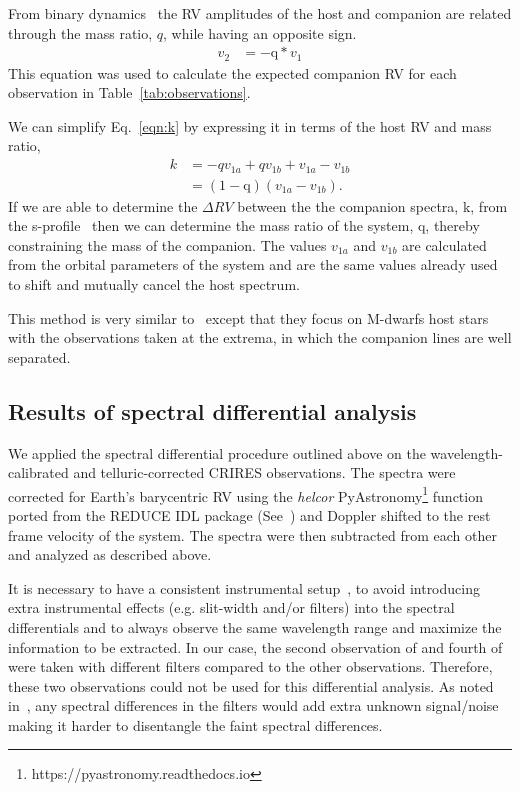 From binary dynamics~\citep[e.g.][]{murray_keplerian_2010} the RV amplitudes of the host and companion are related through the mass ratio, \(q \), while having an opposite sign.
\begin{align}
	v_{2}  &= -\textrm{q} * v_{1} \label{eqn:q_relation}
\end{align}
This equation was used to calculate the expected companion RV for each observation in Table~\ref{tab:observations}. 

We can simplify Eq.~\ref{eqn:k} by expressing it in terms of the host RV and mass ratio,
\begin{align}
	k &= -q v_{1a} + q v_{1b} + v_{1a} - v_{1b} \nonumber \\
	&= (1 - \textrm{q})(v_{1a} - v_{1b}). \label{eqn:k_simplified}
\end{align}
If we are able to determine the \(\Delta RV \) between the the companion spectra, k, from the s-profile~\citep[see ][]{ferluga_separating_1997} then we can determine the mass ratio of the system, q, thereby constraining the mass of the companion. The values \(v_{1a} \) and \(v_{1b} \) are calculated from the orbital parameters of the system and are the same values already used to shift and mutually cancel the host spectrum.

This method is very similar to~\citet{kostogryz_spectral_2013} except that they focus on M-dwarfs host stars with the observations taken at the extrema, in which the companion lines are well separated.


\subsection{Results of spectral differential analysis}

\label{appendix:A2}
We applied the spectral differential procedure outlined above on the wavelength-calibrated and telluric-corrected CRIRES observations. The spectra were corrected for Earth's barycentric RV using the \emph{helcor} PyAstronomy\footnote{https://pyastronomy.readthedocs.io} function ported from the REDUCE IDL package (See~\citet[][]{piskunov_new_2002}) and Doppler shifted to the rest frame velocity of the system. The spectra were then subtracted from each other and analyzed as described above.

It is necessary to have a consistent instrumental setup~\citet{ferluga_separating_1997}, to avoid introducing extra instrumental effects (e.g. slit-width and/or filters) into the spectral differentials and to always observe the same wavelength range and maximize the information to be extracted. In our case, the second observation of  and fourth of  were taken with different filters compared to the other observations. Therefore, these two observations could not be used for this differential analysis. As noted in~\citep{hadrava_disentangling_2009}, any spectral differences in the filters would add extra unknown signal/noise making it harder to disentangle the faint spectral differences.


